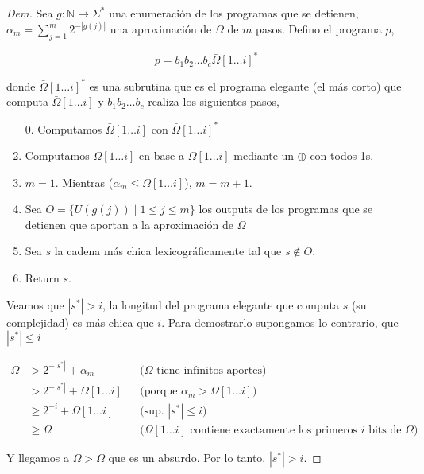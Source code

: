 \documentclass{article}
\theoremstyle{definition} %
\newcommand{\first}[2]{#2[1 \dots #1]}
\begin{document}
\begin{proof}[Dem]
    Sea $g: \mathbb{N} \to \Sigma^*$ una enumeración de los programas que se
    detienen, $\alpha_m = \sum_{j = 1}^{m} 2 ^ {-|g(j)|}$ una aproximación de
    $\Omega$ de $m$ pasos. Defino el programa $p$,

    \[
        p = b_1 b_2 \dots b_c \first{i}{\bar{\Omega}}^*
    \]

    donde $\first{i}{\bar{\Omega}}^*$ es una subrutina que es el programa
    elegante (el más corto) que computa $\first{i}{\bar{\Omega}}$ y $b_1 b_2
    \dots b_c$ realiza los siguientes pasos,

    \begin{enumerate}
        \item[0.] Computamos $\first{i}{\bar{\Omega}}$ con
        $\first{i}{\bar{\Omega}}^*$
        \item Computamos $\first{i}{\Omega}$ en base a
        $\first{i}{\bar{\Omega}}$ mediante un $\oplus$ con todos 1s.
        \item $m = 1$. Mientras ($\alpha_m \leq \first{i}{\Omega}$), $m = m + 1$.
        \item Sea $O = \{ U(g(j)) \mid 1 \leq j \leq m \}$ los outputs de los
        programas que se detienen que aportan a la aproximación de $\Omega$
        \item Sea $s$ la cadena más chica lexicográficamente tal que $s \notin O$.
        \item Return $s$.
    \end{enumerate}

    Veamos que $|s^*| > i$, la longitud del programa elegante que computa $s$
    (su complejidad) es más chica que $i$. Para demostrarlo supongamos lo
    contrario, que $|s^*| \leq i$

    \begin{align*}
        \Omega 
        &> 2^{-|s^*|} + \alpha_m
            &&\text{($\Omega$ tiene infinitos aportes)}\\
        &> 2^{-|s^*|} + \first{i}{\Omega}
            &&\text{(porque $\alpha_m > \first{i}{\Omega}$)}\\
        &\geq 2^{-i} + \first{i}{\Omega}
            &&\text{(sup. $|s^*| \leq i$)}\\
        &\geq \Omega
            &&\text{($\first{i}{\Omega}$ contiene exactamente los primeros $i$ bits de $\Omega$)}
    \end{align*}

    Y llegamos a $\Omega > \Omega$ que es un absurdo. Por lo tanto, $|s^*| > i$.
    

\end{proof}
\end{document}
